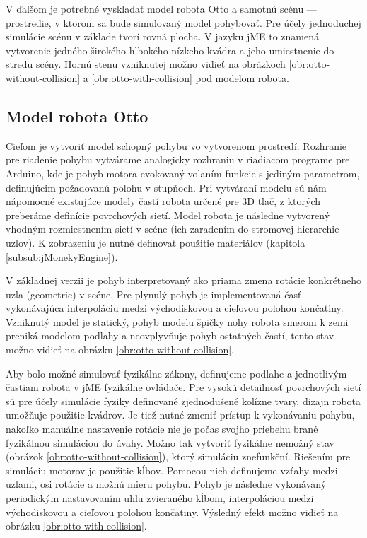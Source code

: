 V ďalšom je potrebné vyskladať model robota Otto a samotnú scénu --- prostredie, v ktorom sa bude simulovaný model pohybovať. Pre účely jednoduchej simulácie scénu v základe tvorí rovná plocha. V jazyku jME to znamená vytvorenie jedného širokého hlbokého nízkeho kvádra a jeho umiestnenie do stredu scény. Hornú stenu vzniknutej  možno vidieť na obrázkoch \ref{obr:otto-without-collision} a \ref{obr:otto-with-collision} pod modelom robota.

\subsection{Model robota Otto}
Cieľom je vytvoriť model schopný pohybu vo vytvorenom prostredí. Rozhranie pre riadenie pohybu vytvárame analogicky rozhraniu v riadiacom programe pre Arduino, kde je pohyb motora evokovaný volaním funkcie s jediným parametrom, definujúcim požadovanú polohu v stupňoch. Pri vytváraní modelu sú nám nápomocné existujúce modely častí robota určené pre 3D tlač, z ktorých preberáme definície povrchových sietí. Model robota je následne vytvorený vhodným rozmiestnením sietí v scéne (ich zaradením do stromovej hierarchie uzlov). K zobrazeniu je nutné definovať použitie materiálov (kapitola \ref{subsub:jMonekyEngine}).

V základnej verzii je pohyb interpretovaný ako priama zmena rotácie konkrétneho uzla (geometrie) v scéne. Pre plynulý pohyb je implementovaná časť vykonávajúca interpoláciu medzi východiskovou a cieľovou polohou končatiny. Vzniknutý model je statický, pohyb modelu špičky nohy robota smerom k zemi preniká modelom podlahy a neovplyvňuje pohyb ostatných častí, tento stav možno vidieť na obrázku \ref{obr:otto-without-collision}.

Aby bolo možné simulovať fyzikálne zákony, definujeme podlahe a jednotlivým častiam robota v jME fyzikálne ovládače. Pre vysokú detailnosť povrchových sietí sú pre účely simulácie fyziky definované zjednodušené kolízne tvary, dizajn robota umožňuje použitie kvádrov. Je tiež nutné zmeniť prístup k vykonávaniu pohybu, nakoľko manuálne nastavenie rotácie nie je počas svojho priebehu brané fyzikálnou simuláciou do úvahy. Možno tak vytvoriť fyzikálne nemožný stav (obrázok \ref{obr:otto-without-collision}), ktorý simuláciu znefunkční. Riešením pre simuláciu motorov je použitie kĺbov. Pomocou nich definujeme vzťahy medzi uzlami, osi rotácie a možnú mieru pohybu. Pohyb je následne vykonávaný periodickým nastavovaním uhlu zvieraného kĺbom, interpoláciou medzi východiskovou a cieľovou polohou končatiny. Výsledný efekt možno vidieť na obrázku \ref{obr:otto-with-collision}.

